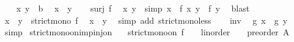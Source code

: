 \begin{isabellebody}
%
\isadelimproof
%
\endisadelimproof
%
\isatagproof
{}\isamarkupfalse%
\isanewline
\ \ \isamarkupfalse%
\ x\ y\ {\isacharcolon}{\kern0pt}{\isacharcolon}{\kern0pt}\ {\isacharprime}{\kern0pt}b\ \isamarkupfalse%
\ {\isachardoublequoteopen}x\ {\isacharless}{\kern0pt}\ y{\isachardoublequoteclose}\isanewline
\ \ \isamarkupfalse%
\ {\isacartoucheopen}surj\ f{\isacartoucheclose}\ \isamarkupfalse%
\ x{\isacharprime}{\kern0pt}\ y{\isacharprime}{\kern0pt}\ \ {\isacharbrackleft}{\kern0pt}simp{\isacharbrackright}{\kern0pt}{\isacharcolon}{\kern0pt}\ {\isachardoublequoteopen}x\ {\isacharequal}{\kern0pt}\ f\ x{\isacharprime}{\kern0pt}{\isachardoublequoteclose}\ {\isachardoublequoteopen}y\ {\isacharequal}{\kern0pt}\ f\ y{\isacharprime}{\kern0pt}{\isachardoublequoteclose}\ \isamarkupfalse%
\ blast\isanewline
\ \ \isamarkupfalse%
\ {\isacartoucheopen}x\ {\isacharless}{\kern0pt}\ y{\isacartoucheclose}\ \ {\isacartoucheopen}strict{\isacharunderscore}{\kern0pt}mono\ f{\isacartoucheclose}\ \isamarkupfalse%
\ {\isachardoublequoteopen}x{\isacharprime}{\kern0pt}\ {\isacharless}{\kern0pt}\ y{\isacharprime}{\kern0pt}{\isachardoublequoteclose}\ \isamarkupfalse%
\ {\isacharparenleft}{\kern0pt}simp\ add{\isacharcolon}{\kern0pt}\ strict{\isacharunderscore}{\kern0pt}mono{\isacharunderscore}{\kern0pt}less{\isacharparenright}{\kern0pt}\isanewline
\ \ \isamarkupfalse%
\ inv\ \isamarkupfalse%
\ {\isachardoublequoteopen}g\ x\ {\isacharless}{\kern0pt}\ g\ y{\isachardoublequoteclose}\ \isamarkupfalse%
\ simp\isanewline
{}\isamarkupfalse%
%
\endisatagproof
{\isafoldproof}%
%
\isadelimproof
\isanewline
%
\endisadelimproof
\isanewline
{}\isamarkupfalse%
\ strict{\isacharunderscore}{\kern0pt}mono{\isacharunderscore}{\kern0pt}on{\isacharunderscore}{\kern0pt}imp{\isacharunderscore}{\kern0pt}inj{\isacharunderscore}{\kern0pt}on{\isacharcolon}{\kern0pt}\isanewline
\ \ \ {\isachardoublequoteopen}strict{\isacharunderscore}{\kern0pt}mono{\isacharunderscore}{\kern0pt}on\ {\isacharparenleft}{\kern0pt}f\ {\isacharcolon}{\kern0pt}{\isacharcolon}{\kern0pt}\ {\isacharparenleft}{\kern0pt}{\isacharunderscore}{\kern0pt}\ {\isacharcolon}{\kern0pt}{\isacharcolon}{\kern0pt}\ linorder{\isacharparenright}{\kern0pt}\ {\isasymRightarrow}\ {\isacharparenleft}{\kern0pt}{\isacharunderscore}{\kern0pt}\ {\isacharcolon}{\kern0pt}{\isacharcolon}{\kern0pt}\ preorder{\isacharparenright}{\kern0pt}{\isacharparenright}{\kern0pt}\ A{\isachardoublequoteclose}\isanewline

\end{isabellebody}
